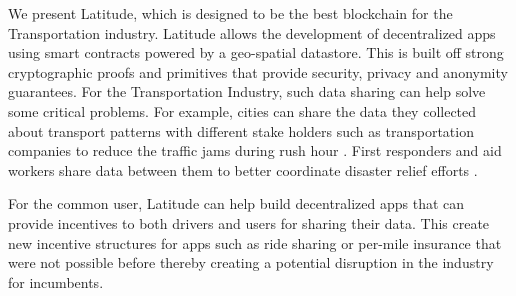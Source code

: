 We present Latitude, which is designed to be the best blockchain for the Transportation industry. Latitude allows the
development of decentralized apps using smart contracts powered by a geo-spatial datastore. This is built off strong
cryptographic proofs and primitives that provide security, privacy and anonymity guarantees.  For the Transportation
Industry, such data sharing can help solve some critical problems.  For example, cities can share the data they
collected about transport patterns with different stake holders such as transportation companies to reduce the traffic
jams during rush hour \cite{traffic_jam}. First responders and aid workers share data between them to better coordinate
disaster relief efforts \cite{bharosa_2010}.

For the common user, Latitude can help build decentralized apps that can provide incentives to both drivers and users
for sharing their data. This create new incentive structures for apps such as ride sharing or per-mile insurance that
were not possible before thereby creating a potential disruption in the industry for incumbents.
%
%


